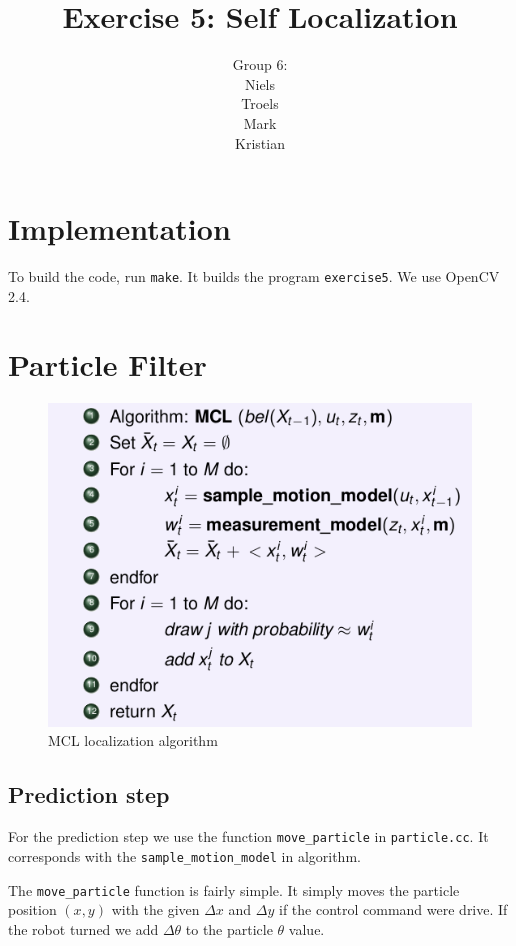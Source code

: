 \documentclass[a4paper,12pt]{article}
\title{Exercise 5: Self Localization}
\author{Group 6:\\Niels\\Troels\\Mark\\Kristian}
\begin{document}
\maketitle
\newpage
\section{Implementation}

To build the code, run \texttt{make}.  It builds the program
\texttt{exercise5}.  We use OpenCV 2.4.


\section{Particle Filter}

\begin{figure}[!h]
\centering
\includegraphics[scale=0.50]{MCL.png}
\caption{MCL localization algorithm}
\label{MCL}
\end{figure}

\subsection{Prediction step}

For the prediction step we use the function \texttt{move_particle} in
\texttt{particle.cc}.  It corresponds with the \texttt{sample_motion_model} in
algorithm.

The \texttt{move_particle} function is fairly simple.  It simply moves the
particle position $(x, y)$ with the given $\Delta x $ and $\Delta y$ if the
control command were drive. If the robot turned we add $\Delta \theta$ to the
particle $\theta$ value.
\end{document}
